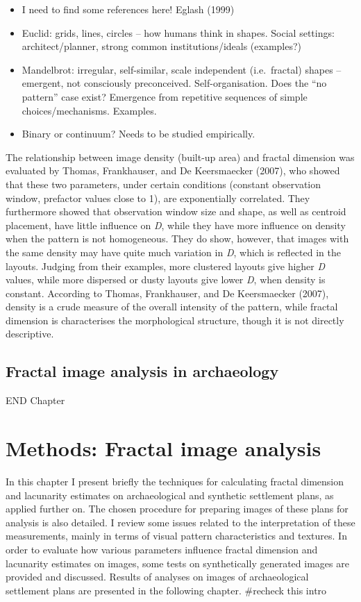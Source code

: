 \documentclass[
  12pt,
  a4paper, twoside]{book}
\begin{document}
\begin{itemize}
\item
  I need to find some references here! Eglash (1999)
\item
  Euclid: grids, lines, circles -- how humans think in shapes. Social settings: architect/planner, strong common institutions/ideals (examples?)
\item
  Mandelbrot: irregular, self-similar, scale independent (i.e.~fractal) shapes -- emergent, not consciously preconceived. Self-organisation. Does the ``no pattern'' case exist? Emergence from repetitive sequences of simple choices/mechanisms. Examples.
\item
  Binary or continuum? Needs to be studied empirically.
\end{itemize}

The relationship between image density (built-up area) and fractal dimension was evaluated by Thomas, Frankhauser, and De Keersmaecker (2007), who showed that these two parameters, under certain conditions (constant observation window, prefactor values close to 1), are exponentially correlated. They furthermore showed that observation window size and shape, as well as centroid placement, have little influence on \emph{D}, while they have more influence on density when the pattern is not homogeneous. They do show, however, that images with the same density may have quite much variation in \emph{D}, which is reflected in the layouts. Judging from their examples, more clustered layouts give higher \emph{D} values, while more dispersed or dusty layouts give lower \emph{D}, when density is constant. According to Thomas, Frankhauser, and De Keersmaecker (2007), density is a crude measure of the overall intensity of the pattern, while fractal dimension is characterises the morphological structure, though it is not directly descriptive.

\hypertarget{image-archaeo}{%
\section{Fractal image analysis in archaeology}\label{image-archaeo}}

END Chapter

\hypertarget{images-methods}{%
\chapter{Methods: Fractal image analysis}\label{images-methods}}

In this chapter I present briefly the techniques for calculating fractal dimension and lacunarity estimates on archaeological and synthetic settlement plans, as applied further on. The chosen procedure for preparing images of these plans for analysis is also detailed. I review some issues related to the interpretation of these measurements, mainly in terms of visual pattern characteristics and textures. In order to evaluate how various parameters influence fractal dimension and lacunarity estimates on images, some tests on synthetically generated images are provided and discussed. Results of analyses on images of archaeological settlement plans are presented in the following chapter. \#recheck this intro
\end{document}
